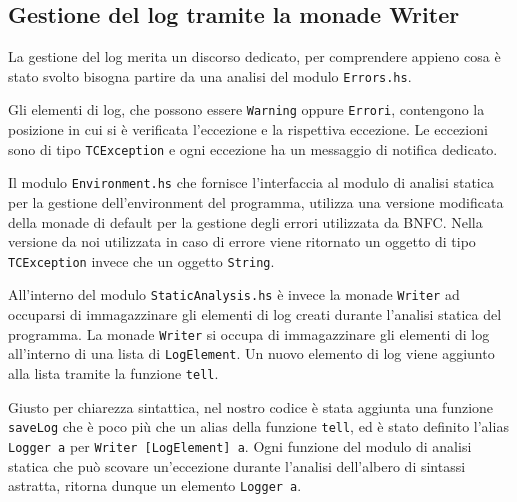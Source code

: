 \subsection{Gestione del log tramite la monade Writer}
La gestione del log merita un discorso dedicato, per comprendere appieno cosa è stato svolto bisogna partire da una analisi del modulo \texttt{Errors.hs}.

Gli elementi di log, che possono essere \texttt{Warning} oppure \texttt{Errori}, contengono la posizione in cui si è verificata l'eccezione e la rispettiva eccezione.
Le eccezioni sono di tipo \texttt{TCException} e ogni eccezione ha un messaggio di notifica dedicato.

Il modulo \texttt{Environment.hs} che fornisce l'interfaccia al modulo di analisi statica per la gestione dell'environment del programma, utilizza una versione modificata della monade di default per la gestione degli errori utilizzata da BNFC. Nella versione da noi utilizzata in caso di errore viene ritornato un oggetto di tipo \texttt{TCException} invece che un oggetto \texttt{String}.

All'interno del modulo \texttt{StaticAnalysis.hs} è invece la monade \texttt{Writer} ad occuparsi di immagazzinare gli elementi di log creati durante l'analisi statica del programma.
La monade \texttt{Writer} si occupa di immagazzinare gli elementi di log all'interno di una lista di \texttt{LogElement}. Un nuovo elemento di log viene aggiunto alla lista tramite la funzione \texttt{tell}.

Giusto per chiarezza sintattica, nel nostro codice è stata aggiunta una funzione \texttt{saveLog} che è poco più che un alias della funzione \texttt{tell}, ed è stato definito l'alias \texttt{Logger a} per \texttt{Writer [LogElement] a}.
Ogni funzione del modulo di analisi statica che può scovare un'eccezione durante l'analisi dell'albero di sintassi astratta, ritorna dunque un elemento \texttt{Logger a}.
